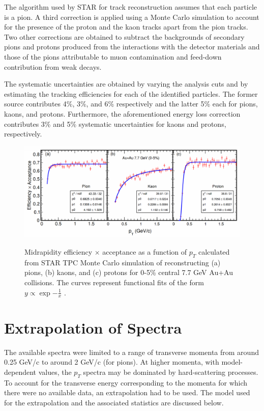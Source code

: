 The algorithm used by STAR for track reconstruction assumes that each particle is a pion. A third correction is applied using a Monte Carlo simulation to account for the presence of the proton and the kaon tracks apart from the pion tracks. Two other corrections are obtained to subtract the backgrounds of secondary pions and protons produced from the interactions with the detector materials and those of the pions attributable to muon contamination and feed-down contribution from weak decays.

The systematic uncertainties are obtained by varying the analysis cuts and by estimating the tracking efficiencies for each of the identified particles. The former source contributes 4\%, 3\%, and 6\% respectively and the latter 5\% each for pions, kaons, and protons. Furthermore, the aforementioned energy loss correction contributes 3\% and 5\% systematic uncertainties for kaons and protons, respectively.

\begin{figure}[h]
  \centering
  \includegraphics[width=6.5in]{../figures/Adamzyck_correction1.png}\\
  \caption{Midrapidity efficiency $\times$ acceptance as a function of $p_{T}$ calculated from STAR TPC Monte Carlo simulation of reconstructing (a) pions, (b) kaons, and (c) protons for 0-5\% central 7.7 GeV Au+Au collisions. The curves represent functional fits of the form $y \propto \exp{-\frac{1}{x}}$ \cite{PhysRevC.96.044904}.}\label{fig:AdamczykCorrection1}
\end{figure}

\section{Extrapolation of Spectra}
The available spectra were limited to a range of transverse momenta from around 0.25 GeV/c to around 2 GeV/c (for pions). At higher momenta, with model-dependent values, the $p_{T}$ spectra may be dominated by hard-scattering processes. To account for the transverse energy corresponding to the momenta for which there were no available data, an extrapolation had to be used. The model used for the extrapolation and the associated statistics are discussed below.

